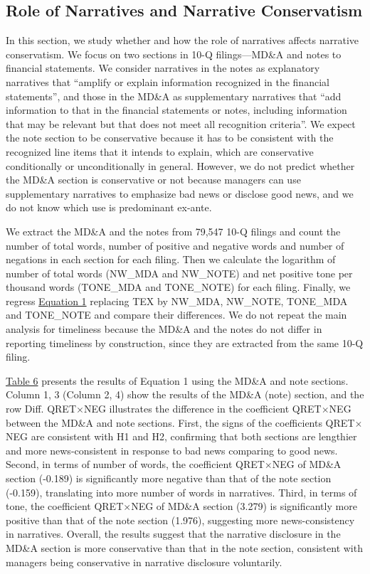 \documentclass[a4paper]{article}
\begin{document}
\begin{spacing}{2}
\subsection{Role of Narratives and Narrative Conservatism}
In this section, we study whether and how the role of narratives affects narrative conservatism. We focus on two sections in 10-Q filings---MD\&A and notes to financial statements. We consider narratives in the notes as explanatory narratives that ``amplify or explain information recognized in the financial statements'', and those in the MD\&A as supplementary narratives that ``add information to that in the financial statements or notes, including information that may be relevant but that does not meet all recognition criteria''\cite[CON5-7]{fasbStatementFinancialAccounting1984}. We expect the note section to be conservative because it has to be consistent with the recognized line items that it intends to explain, which are conservative conditionally or unconditionally in general. However, we do not predict whether the MD\&A section is conservative or not because managers can use supplementary narratives to emphasize bad news or disclose good news, and we do not know which use is predominant ex-ante.

We extract the MD\&A and the notes from 79,547 10-Q filings and count the number of total words, number of positive and negative words and number of negations in each section for each filing. Then we calculate the logarithm of number of total words (NW\_MDA and NW\_NOTE) and net positive tone per thousand words (TONE\_MDA and TONE\_NOTE) for each filing. Finally, we regress \hyperref[eq1]{Equation 1} replacing TEX by NW\_MDA, NW\_NOTE, TONE\_MDA and TONE\_NOTE and compare their differences. We do not repeat the main analysis for timeliness because the MD\&A and the notes do not differ in reporting timeliness by construction, since they are extracted from the same 10-Q filing.

\hyperref[T6]{Table 6} presents the results of Equation 1 using the MD\&A and note sections. Column 1, 3 (Column 2, 4) show the results of the MD\&A (note) section, and the row Diff. QRET$\times$NEG illustrates the difference in the coefficient QRET$\times$NEG between the MD\&A and note sections. First, the signs of the coefficients QRET$\times$NEG are consistent with H1 and H2, confirming that both sections are lengthier and more news-consistent in response to bad news comparing to good news. Second, in terms of number of words, the coefficient QRET$\times$NEG of MD\&A section (-0.189) is significantly more negative than that of the note section (-0.159), translating into more number of words in narratives. Third, in terms of tone, the coefficient QRET$\times$NEG of MD\&A section (3.279) is significantly more positive than that of the note section (1.976), suggesting more news-consistency in narratives. Overall, the results suggest that the narrative disclosure in the MD\&A section is more conservative than that in the note section, consistent with managers being conservative in narrative disclosure voluntarily.


\end{spacing}
\end{document}
